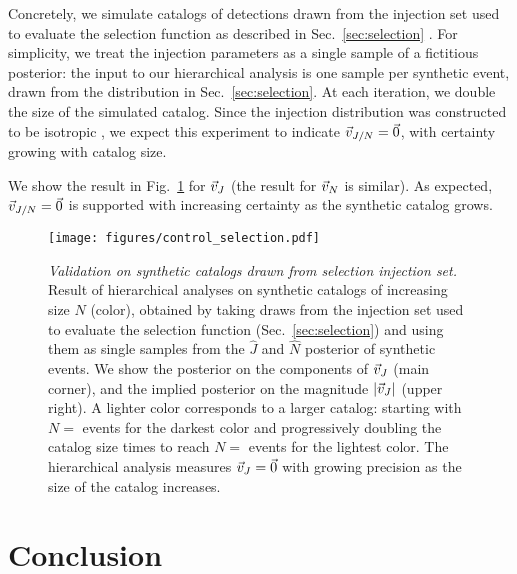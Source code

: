 \documentclass[aps,prd,twocolumn,superscriptaddress,preprintnumbers,floatfix,nofootinbib]{revtex4-2}
\newcommand{\Nitersel}{}
\newcommand{\Nstartsel}{}
\newcommand{\Nmaxsel}{}
\begin{document}

Concretely, we simulate catalogs of detections drawn from the injection set used to evaluate the selection function as described in Sec.~\ref{sec:selection} \cite{o3-selection}.
For simplicity, we treat the injection parameters as a single sample of a fictitious posterior: the input to our hierarchical analysis is one sample per synthetic event, drawn from the distribution in Sec.~\ref{sec:selection}.
At each iteration, we double the size of the simulated catalog.
Since the injection distribution was constructed to be isotropic \cite{o3-selection}, we expect this experiment to indicate $\vec{v}_{J/N} = \vec{0}$, with certainty growing with catalog size.

We show the result in Fig.~\ref{fig:control-sel} for $\vec{v}_{J}$ (the result for $\vec{v}_{N}$ is similar).
As expected, $\vec{v}_{J/N} = \vec{0}$ is supported with increasing certainty as the synthetic catalog grows.

\begin{figure}
\texttt{[image: figures/control\_selection.pdf]}
\caption{\emph{Validation on synthetic catalogs drawn from selection injection set.}
Result of hierarchical analyses on synthetic catalogs of increasing size $N$ (color), obtained by taking draws from the injection set used to evaluate the selection function (Sec.~\ref{sec:selection}) and using them as single samples from the $\hat{J}$ and $\hat{N}$ posterior of synthetic events.
We show the posterior on the components of $\vec{v}_{J}$ (main corner), and the implied posterior on the magnitude $|\vec{v}_{J}|$ (upper right).
A lighter color corresponds to a larger catalog: starting with $N = \Nstartsel$ events for the darkest color and progressively doubling the catalog size \Nitersel times to reach $N = \Nmaxsel$ events for the lightest color.
The hierarchical analysis measures $\vec{v}_{J} = \vec{0}$ with growing precision as the size of the catalog increases.
}
\label{fig:control-sel}
\end{figure}

\section{Conclusion}
\label{sec:conclusion}
\end{document}
